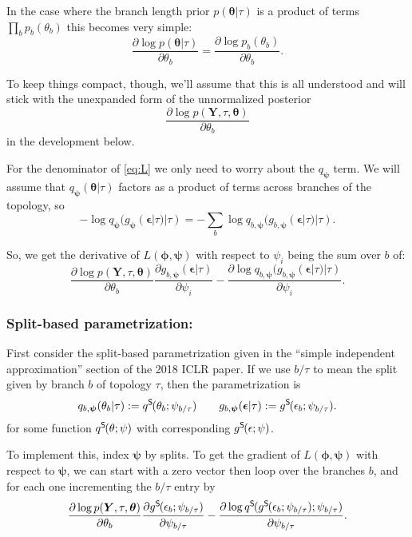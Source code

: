 \documentclass{article}
\newcommand{\qSplit}{q^\textsf{S}\hspace{-1pt}}
\newcommand{\gSplit}{g^\textsf{S}\hspace{-1pt}}
\begin{document}
In the case where the branch length prior $p(\bm\theta | \tau)$ is a product of terms $\prod_b p_b(\theta_b)$ this becomes very simple:
\[
    \frac{\partial \log p(\bm\theta | \tau)}{\partial \theta_b} =
    \frac{\partial \log p_b(\theta_b)}{\partial \theta_b}.
\]

To keep things compact, though, we'll assume that this is all understood and will stick with the unexpanded form of the unnormalized posterior
\[
    \frac{\partial \log p(\bm{Y}, \tau, \bm\theta)}{\partial \theta_b}
\]
in the development below.

For the denominator of \eqref{eq:L} we only need to worry about the $q_{\bm\psi}$ term.
We will assume that $q_{\bm\psi}(\bm\theta | \tau)$ factors as a product of terms across branches of the topology, so
\[
    - \log q_{\bm{\psi}}(g_{\bm{\psi}}(\bm{\epsilon}|\tau)|\tau) =
    - \sum_b \log q_{b, \bm{\psi}}(g_{b, \bm{\psi}}(\bm{\epsilon}|\tau)|\tau).
\]

So, we get the derivative of $L(\bm\phi, \bm\psi)$ with respect to $\psi_i$ being the sum over $b$ of:
\begin{equation}
    \frac{\partial \log p(\bm{Y}, \tau, \bm\theta)}{\partial \theta_b}
    \frac{\partial g_{b,\bm\psi}(\bm\epsilon | \tau)}{\partial \psi_i}
    - \frac{\partial \log q_{b, \bm\psi}(g_{b, \bm\psi}(\bm\epsilon|\tau)|\tau)}{\partial \psi_i}.
    \label{eq:dLdPsi}
\end{equation}

\subsubsection*{Split-based parametrization:}
First consider the split-based parametrization given in the ``simple independent approximation'' section of the 2018 ICLR paper.
If we use $b \slash \tau$ to mean the split given by branch $b$ of topology $\tau$, then the parametrization is
\[
q_{b, \bm{\psi}}(\theta_b | \tau) := \qSplit(\theta_b; \psi_{b \slash \tau})
\qquad
g_{b,\bm\psi}(\bm\epsilon | \tau) := \gSplit(\epsilon_b; \psi_{b \slash \tau}).
\]
for some function $\qSplit(\theta; \psi)$ with corresponding $\gSplit(\epsilon; \psi)$.

To implement this, index $\bm\psi$ by splits.
To get the gradient of $L(\bm\phi, \bm\psi)$ with respect to $\bm\psi$, we can start with a zero vector then loop over the branches $b$, and for each one incrementing the $b \slash \tau$ entry by
\begin{equation*}
    \frac{\partial \log p(\bm{Y}, \tau, \bm\theta)}{\partial \theta_b}
    \frac{\partial \gSplit(\epsilon_b; \psi_{b \slash \tau})}{\partial \psi_{b \slash \tau}}
    - \frac{\partial \log \qSplit(\gSplit(\epsilon_b; \psi_{b \slash \tau}); \psi_{b \slash \tau})}{\partial \psi_{b \slash \tau}}.
\end{equation*}
\end{document}
